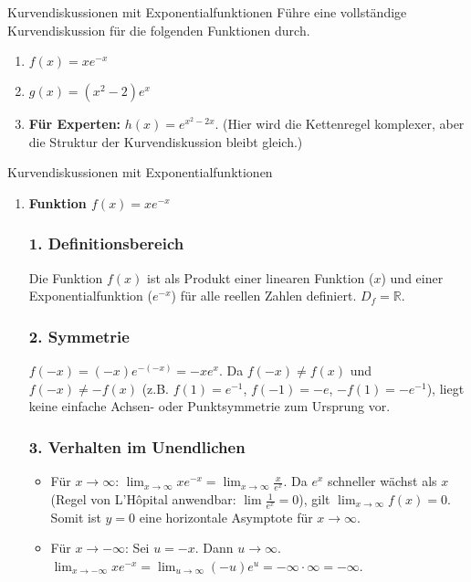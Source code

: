 \begin{aufgabenumgebung}{Kurvendiskussionen mit Exponentialfunktionen}
Führe eine vollständige Kurvendiskussion für die folgenden Funktionen durch.
\begin{enumerate}
    \item $f(x) = x e^{-x}$
    \item $g(x) = (x^2-2)e^x$
    \item \textbf{Für Experten:} $h(x) = e^{x^2-2x}$. (Hier wird die Kettenregel komplexer, aber die Struktur der Kurvendiskussion bleibt gleich.)
\end{enumerate}
\end{aufgabenumgebung}



\begin{loesungsumgebung}{Kurvendiskussionen mit Exponentialfunktionen}

\begin{enumerate}[label=(\alph*)]
    \item \textbf{Funktion $f(x) = x e^{-x}$}

    \subsubsection*{1. Definitionsbereich}
    Die Funktion $f(x)$ ist als Produkt einer linearen Funktion ($x$) und einer Exponentialfunktion ($e^{-x}$) für alle reellen Zahlen definiert.
    $D_f = \mathbb{R}$.

    \subsubsection*{2. Symmetrie}
    $f(-x) = (-x)e^{-(-x)} = -xe^x$.
    Da $f(-x) \neq f(x)$ und $f(-x) \neq -f(x)$ (z.B. $f(1)=e^{-1}$, $f(-1)=-e$, $-f(1)=-e^{-1}$), liegt keine einfache Achsen- oder Punktsymmetrie zum Ursprung vor.

    \subsubsection*{3. Verhalten im Unendlichen}
    \begin{itemize}
        \item Für $x \to \infty$: $\lim_{x \to \infty} x e^{-x} = \lim_{x \to \infty} \frac{x}{e^x}$. Da $e^x$ schneller wächst als $x$ (Regel von L'Hôpital anwendbar: $\lim \frac{1}{e^x} = 0$), gilt $\lim_{x \to \infty} f(x) = 0$.
        Somit ist $y=0$ eine horizontale Asymptote für $x \to \infty$.
        \item Für $x \to -\infty$: Sei $u = -x$. Dann $u \to \infty$.
        $\lim_{x \to -\infty} x e^{-x} = \lim_{u \to \infty} (-u)e^u = -\infty \cdot \infty = -\infty$.
    \end{itemize}


\end{enumerate}
\end{loesungsumgebung}
